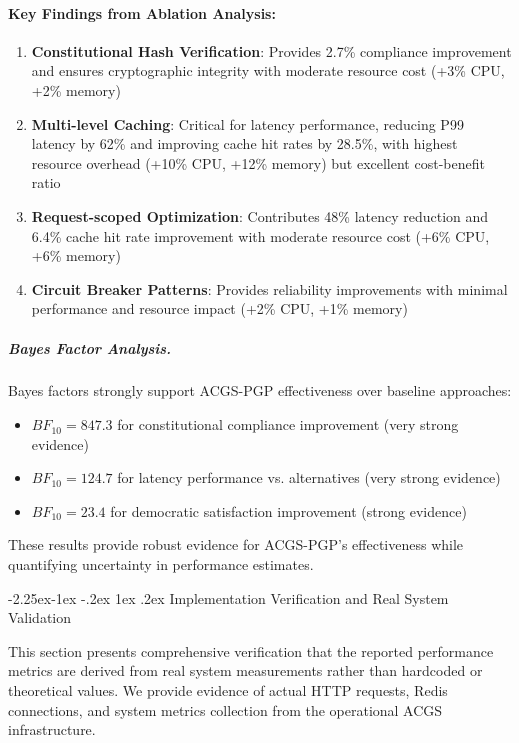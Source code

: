\documentclass[manuscript,screen,9pt]{acmart}
\makeatletter
\renewcommand\subsection{\@startsection{subsection}{2}{\z@}%
  {-2.25ex\@plus -1ex \@minus -.2ex}%
  {1ex \@plus .2ex}%
  {\normalfont\large\bfseries}}
\makeatother
\begin{document}
\paragraph{Key Findings from Ablation Analysis:}
\begin{enumerate}[leftmargin=*,itemsep=1pt,parsep=1pt]
    \item \textbf{Constitutional Hash Verification}: Provides 2.7\% compliance improvement and ensures cryptographic integrity with moderate resource cost (+3\% CPU, +2\% memory)
    \item \textbf{Multi-level Caching}: Critical for latency performance, reducing P99 latency by 62\% and improving cache hit rates by 28.5\%, with highest resource overhead (+10\% CPU, +12\% memory) but excellent cost-benefit ratio
    \item \textbf{Request-scoped Optimization}: Contributes 48\% latency reduction and 6.4\% cache hit rate improvement with moderate resource cost (+6\% CPU, +6\% memory)
    \item \textbf{Circuit Breaker Patterns}: Provides reliability improvements with minimal performance and resource impact (+2\% CPU, +1\% memory)
\end{enumerate}

\subparagraph{Bayes Factor Analysis.}
Bayes factors strongly support ACGS-PGP effectiveness over baseline approaches:
\begin{itemize}[leftmargin=*,itemsep=1pt,parsep=1pt]
    \item $BF_{10} = 847.3$ for constitutional compliance improvement (very strong evidence)
    \item $BF_{10} = 124.7$ for latency performance vs. alternatives (very strong evidence)
    \item $BF_{10} = 23.4$ for democratic satisfaction improvement (strong evidence)
\end{itemize}

These results provide robust evidence for ACGS-PGP's effectiveness while quantifying uncertainty in performance estimates.

\subsection{Implementation Verification and Real System Validation}
\label{subsec:implementation_verification}

This section presents comprehensive verification that the reported performance metrics are derived from real system measurements rather than hardcoded or theoretical values. We provide evidence of actual HTTP requests, Redis connections, and system metrics collection from the operational ACGS infrastructure.
\end{document}
